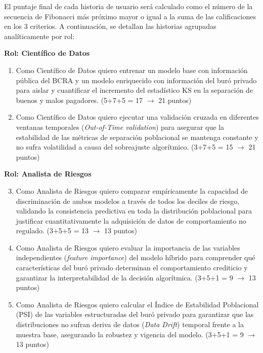 \documentclass[
11pt, %
codirector, %
]{charter}
\begin{document}
El puntaje final de cada historia de usuario será calculado como el número de la secuencia de Fibonacci más próximo mayor o igual a la suma de las calificaciones en los 3 criterios. A continuación, se detallan las historias agrupadas analíticamente por rol:

\textbf{Rol: Científico de Datos}
\begin{enumerate}
    \item Como Científico de Datos quiero entrenar un modelo base con información pública del BCRA y un modelo enriquecido con información del buró privado para aislar y cuantificar el incremento del estadístico KS en la separación de buenos y malos pagadores. (5+7+5 = 17 $\rightarrow$ 21 puntos)
    
    \item Como Científico de Datos quiero ejecutar una validación cruzada en diferentes ventanas temporales (\textit{Out-of-Time validation}) para asegurar que la estabilidad de las métricas de separación poblacional se mantenga constante y no sufra volatilidad a causa del sobreajuste algorítmico. (3+7+5 = 15 $\rightarrow$ 21 puntos)
\end{enumerate}

\textbf{Rol: Analista de Riesgos}
\begin{enumerate}\setcounter{enumi}{2}
    \item Como Analista de Riesgos quiero comparar empíricamente la capacidad de discriminación de ambos modelos a través de todos los deciles de riesgo, validando la consistencia predictiva en toda la distribución poblacional para justificar cuantitativamente la adquisición de datos de comportamiento no regulado. (3+5+5 = 13 $\rightarrow$ 13 puntos)
    
    \item Como Analista de Riesgos quiero evaluar la importancia de las variables independientes (\textit{feature importance}) del modelo híbrido para comprender qué características del buró privado determinan el comportamiento crediticio y garantizar la interpretabilidad de la decisión algorítmica. (3+5+1 = 9 $\rightarrow$ 13 puntos)
    
    \item Como Analista de Riesgos quiero calcular el Índice de Estabilidad Poblacional (PSI) de las variables estructuradas del buró privado para garantizar que las distribuciones no sufran deriva de datos (\textit{Data Drift}) temporal frente a la muestra base, asegurando la robustez y vigencia del modelo. (3+5+1 = 9 $\rightarrow$ 13 puntos)
\end{enumerate}
\end{document}
